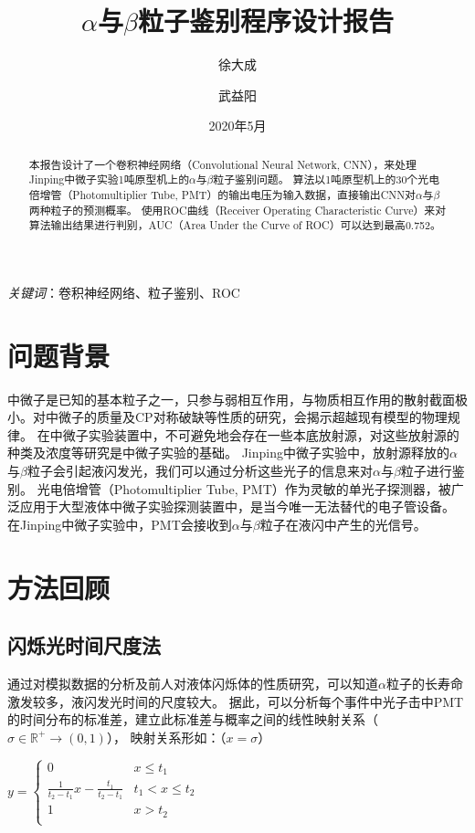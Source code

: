 \documentclass{ctexart}
\title{$\alpha$与$\beta$粒子鉴别程序设计报告}
\author[1]{徐大成}
\author[2]{武益阳}
\affil[1]{清华大学工程物理系}
\affil[2]{清华大学物理系}
\date{2020年5月}
\begin{document}
\maketitle

\newpage
\tableofcontents

\begin{abstract}
    本报告设计了一个卷积神经网络（Convolutional Neural Network, CNN），来处理Jinping中微子实验1吨原型机上的$\alpha$与$\beta$粒子鉴别问题。
    算法以1吨原型机上的30个光电倍增管（Photomultiplier Tube, PMT）的输出电压为输入数据，直接输出CNN对$\alpha$与$\beta$两种粒子的预测概率。
    使用ROC曲线（Receiver Operating Characteristic Curve）来对算法输出结果进行判别，AUC（Area Under the Curve of ROC）可以达到最高0.752。
\end{abstract}

\textit{关键词}：卷积神经网络、粒子鉴别、ROC

\section{问题背景}
中微子是已知的基本粒子之一，只参与弱相互作用，与物质相互作用的散射截面极小。对中微子的质量及CP对称破缺等性质的研究，会揭示超越现有模型的物理规律。
在中微子实验装置中，不可避免地会存在一些本底放射源，对这些放射源的种类及浓度等研究是中微子实验的基础。
Jinping中微子实验中，放射源释放的$\alpha$与$\beta$粒子会引起液闪发光，我们可以通过分析这些光子的信息来对$\alpha$与$\beta$粒子进行鉴别。
光电倍增管（Photomultiplier Tube, PMT）作为灵敏的单光子探测器，被广泛应用于大型液体中微子实验探测装置中，是当今唯一无法替代的电子管设备。
在Jinping中微子实验中，PMT会接收到$\alpha$与$\beta$粒子在液闪中产生的光信号。

\section{方法回顾}
\subsection{闪烁光时间尺度法}
通过对模拟数据的分析及前人对液体闪烁体的性质研究，可以知道$\alpha$粒子的长寿命激发较多，液闪发光时间的尺度较大。
据此，可以分析每个事件中光子击中PMT的时间分布的标准差，建立此标准差与概率之间的线性映射关系（$\sigma \in \mathbb{R}^{+} \rightarrow (0,1)$），
映射关系形如：（$x = \sigma$）

$y = \begin{cases}
    0 & x \leq t_{1} \\
    \frac{1}{t_{2}-t_{1}}x-\frac{t_{1}}{t_{2}-t_{1}} & t_{1} < x \leq t_{2} \\
    1 & x > t_{2} \\
\end{cases}$
\end{document}
